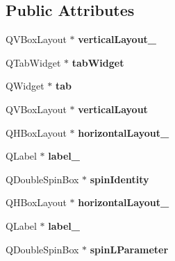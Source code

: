 \subsection*{Public Attributes}
\begin{DoxyCompactItemize}
\item 
\mbox{\label{class_ui___main_form_a06a797579dcf9aaca3c70c0a35c1559c}} 
Q\+V\+Box\+Layout $\ast$ {\bfseries vertical\+Layout\+\_}
\item 
\mbox{\label{class_ui___main_form_a845ac6fea1cb3a3d3dfa5bc67ddd4263}} 
Q\+Tab\+Widget $\ast$ {\bfseries tab\+Widget}
\item 
\mbox{\label{class_ui___main_form_af01ae862b6f6061ad4ed211f72e235df}} 
Q\+Widget $\ast$ {\bfseries tab}
\item 
\mbox{\label{class_ui___main_form_a5e14da3ca81145c355d9031c9abbace3}} 
Q\+V\+Box\+Layout $\ast$ {\bfseries vertical\+Layout}
\item 
\mbox{\label{class_ui___main_form_a2e7958ad2620be5bbdb20b8dfd6aeeba}} 
Q\+H\+Box\+Layout $\ast$ {\bfseries horizontal\+Layout\+\_}
\item 
\mbox{\label{class_ui___main_form_a519b1bbb5c90ee72e58d7f4efe722749}} 
Q\+Label $\ast$ {\bfseries label\+\_}
\item 
\mbox{\label{class_ui___main_form_a0890bcf10e052dc1148276300db51eb0}} 
Q\+Double\+Spin\+Box $\ast$ {\bfseries spin\+Identity}
\item 
\mbox{\label{class_ui___main_form_ae7d38c14cd5361197461edc18f74bb26}} 
Q\+H\+Box\+Layout $\ast$ {\bfseries horizontal\+Layout\+\_}
\item 
\mbox{\label{class_ui___main_form_ac1ca806dd7711bd96324148fa410a98f}} 
Q\+Label $\ast$ {\bfseries label\+\_}
\item 
\mbox{\label{class_ui___main_form_a246deab63d5afcbfd2addb71551083e5}} 
Q\+Double\+Spin\+Box $\ast$ {\bfseries spin\+L\+Parameter}

\end{DoxyCompactItemize}
